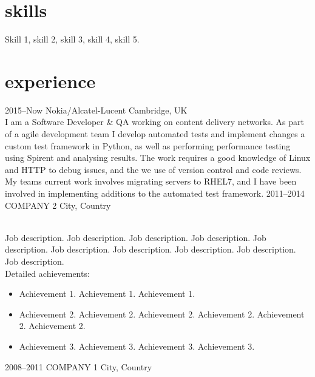 \documentclass[]{cv-style}          %
\begin{document}
\section{skills}
  \vspace{-0.2cm}

Skill 1, skill 2, skill 3, skill 4, skill 5.


\section{experience}

\begin{entrylist}
\entry
  {2015--Now}
  {Nokia/Alcatel-Lucent}
  {Cambridge, UK}
  {\\
  I am a Software Developer \& QA working on content delivery networks. As part of a agile development team I develop automated tests and implement changes a custom test framework in Python, as well as performing performance testing using Spirent and analysing results. The work requires a good knowledge of Linux and HTTP to debug issues, and the we use of version control and code reviews. My teams current work involves migrating servers to RHEL7, and I have been involved in implementing additions to the automated test framework.}
\entry
  {2011--2014}
  {COMPANY 2}
  {City, Country}
  {\\
  Job description. Job description. Job description. Job description. Job description. Job description. Job description. Job description. Job description. Job description.\\
  Detailed achievements:
  \begin{itemize}
    \item Achievement 1. Achievement 1. Achievement 1. 
    \item Achievement 2. Achievement 2. Achievement 2. Achievement 2. Achievement 2. Achievement 2.
    \item Achievement 3. Achievement 3. Achievement 3. Achievement 3.  
  \end{itemize}}
\entry
  {2008--2011}
  {COMPANY 1}
  {City, Country}
  {\\
}
\end{entrylist}
\end{document}
